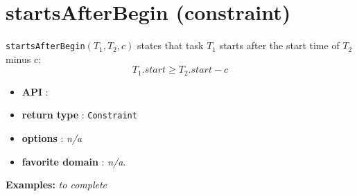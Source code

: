 \section{startsAfterBegin (constraint)}\label{startsafterbegin:startsafterbeginconstraint}\hypertarget{startsafterbegin:startsafterbeginconstraint}{}
\begin{notedef}
\texttt{startsAfterBegin}$(T_1,T_2,c)$  states that task $T_1$ starts after the start time of $T_2$ minus $c$:
  $$T_{1}.start \ge T_{2}.start - c$$
\end{notedef}

\begin{itemize}
	\item \textbf{API} :
	\item \textbf{return type} : \texttt{Constraint}
	\item \textbf{options} : \emph{n/a}
	\item \textbf{favorite domain} : \emph{n/a}.
\end{itemize}

\textbf{Examples:}
%
\emph{to complete}
